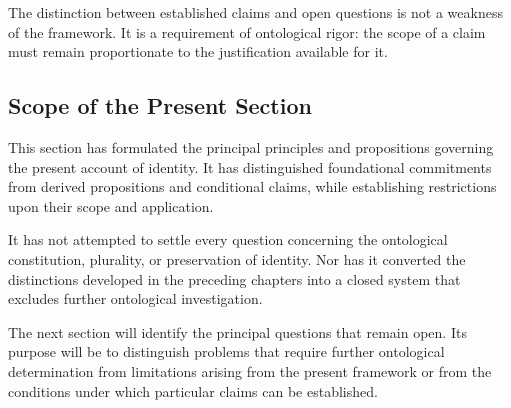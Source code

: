 The distinction between established claims and open
questions is not a weakness of the framework. It is
a requirement of ontological rigor: the scope of a
claim must remain proportionate to the justification
available for it.


\subsection{Scope of the Present Section}

This section has formulated the principal principles
and propositions governing the present account of
identity. It has distinguished foundational commitments
from derived propositions and conditional claims, while
establishing restrictions upon their scope and
application.

It has not attempted to settle every question concerning
the ontological constitution, plurality, or preservation
of identity. Nor has it converted the distinctions
developed in the preceding chapters into a closed
system that excludes further ontological investigation.

The next section will identify the principal questions
that remain open. Its purpose will be to distinguish
problems that require further ontological determination
from limitations arising from the present framework
or from the conditions under which particular claims
can be established.

